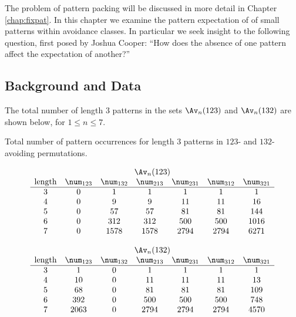 \documentclass[12pt,twoside]{memoir}
\begin{document}
      The problem of pattern packing will be discussed in more detail in Chapter
      \ref{chap:fixpat}. In this chapter we examine the pattern expectation of
      of small patterns within avoidance classes. In particular we seek insight to
      the following question, first posed by Joshua Cooper: ``How does the absence
      of one pattern affect the expectation of another?''


    \subsection{Background and Data}
      
      The total number of length $3$ patterns in the sets $\Av_n(123)$ and
      $\Av_n(132)$ are shown below, for $1 \leq n \leq 7$.  

      \begin{table}[t] \label{expat:tab:data}
      \caption[Total number of pattern occurrences]{Total number of pattern
          occurrences for length $3$ patterns in $123$- and $132$-avoiding
          permutations.}
      $$
      \begin{array}{ccccccc}
          \multicolumn{7}{c}{\Av_n(123) } \\
          \text{length} & \num_{123} & \num_{132} & \num_{213}
          & \num_{231} & \num_{312} & \num_{321} \\
          \hline
          3  & 0     &    1  &    1 &    1 &    1 &    1  \\
          4  & 0     &    9  &    9 &   11 &   11 &   16  \\
          5  & 0     &    57 &   57 &   81 &   81 &  144  \\
          6  & 0     &   312 &  312 &  500 &  500 & 1016  \\
          7  & 0     &  1578 & 1578 & 2794 & 2794 & 6271
        \end{array}
      $$

      \vspace{1pc}

      $$
      \begin{array}{ccccccc}
          \multicolumn{7}{c}{\Av_n(132) } \\
          \text{length} & \num_{123} & \num_{132} & \num_{213}
          & \num_{231} & \num_{312} & \num_{321} \\
          \hline
         3  & 1     &    0  &    1 &    1 &    1 &    1  \\
         4  & 10    &    0  &   11 &   11 &   11 &   13  \\
         5  & 68    &    0  &   81 &   81 &   81 &  109  \\
         6  & 392   &    0  &  500 &  500 &  500 &  748  \\
         7  & 2063  &    0  & 2794 & 2794 & 2794 & 4570
       \end{array}
      $$
      \end{table}
\end{document}
